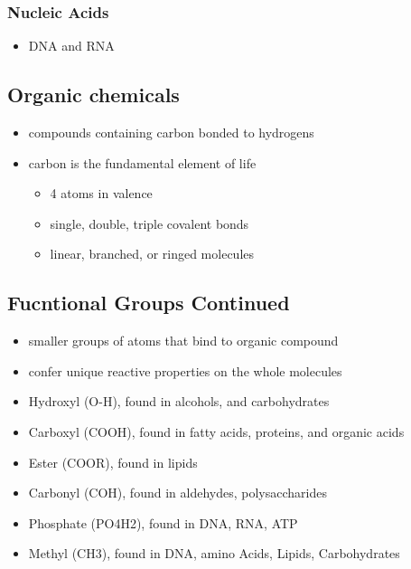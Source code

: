 \documentclass[11pt]{article}
\begin{document}
\subsubsection{Nucleic Acids}
\label{sec:org74d81d9}
\begin{itemize}
\item DNA and RNA
\end{itemize}
\subsection{Organic chemicals}
\label{sec:orgc4d3b36}
\begin{itemize}
\item compounds containing carbon bonded to hydrogens
\item carbon is the fundamental element of life
\begin{itemize}
\item 4 atoms in valence
\item single, double, triple covalent bonds
\item linear, branched, or ringed molecules
\end{itemize}
\end{itemize}
\subsection{Fucntional Groups Continued}
\label{sec:org2aceb21}
\begin{itemize}
\item smaller groups of atoms that bind to organic compound
\item confer unique reactive properties on the whole molecules
\item Hydroxyl (O-H), found in alcohols, and carbohydrates
\item Carboxyl (COOH), found in fatty acids, proteins, and organic acids
\item Ester (COOR), found in lipids
\item Carbonyl (COH), found in aldehydes, polysaccharides
\item Phosphate (PO4H2), found in DNA, RNA, ATP
\item Methyl (CH3), found in DNA, amino Acids, Lipids, Carbohydrates
\end{itemize}
\end{document}
